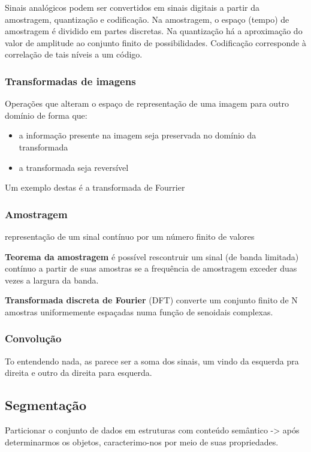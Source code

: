 \documentclass[twocolumn, 10pt]{article}
\begin{document}
Sinais analógicos podem ser convertidos em sinais digitais a partir da amostragem, quantização e codificação.
Na amostragem, o espaço (tempo) de amostragem é dividido em partes discretas. Na quantização há a aproximação do valor de amplitude ao conjunto finito de possibilidades. Codificação corresponde à correlação de tais níveis a um código.

\subsubsection*{Transformadas de imagens}
\label{sec:org4dadf5f}
Operações que alteram o espaço de representação de uma imagem para outro domínio de forma que:
\begin{itemize}
\item a informação presente na imagem seja preservada no domínio da transformada
\item a transformada seja reversível
\end{itemize}

Um exemplo destas é a transformada de Fourrier

\subsubsection*{Amostragem}
\label{sec:org53d46ed}
representação de um sinal contínuo por um número finito de valores

\textbf{Teorema da amostragem} é possível rescontruir um sinal (de banda limitada) contínuo  a partir de suas amostras se a frequência de amostragem exceder duas vezes a largura da banda.

\textbf{Transformada discreta de Fourier} (DFT) converte um conjunto finito de N amostras uniformemente espaçadas numa função de senoidais complexas.

\subsubsection*{Convolução}
\label{sec:org240df4b}
To entendendo nada, as parece ser a soma dos sinais, um vindo da esquerda pra direita e outro da direita para esquerda.
\subsection*{Segmentação}
\label{sec:org1b56c36}
Particionar o conjunto de dados em estruturas com conteúdo semântico -> após determinarmos os objetos, caracterimo-nos por meio de suas propriedades.
\end{document}
